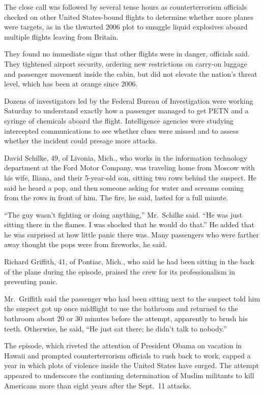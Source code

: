 ﻿\documentclass[12pt]{article}
\begin{document}
The close call was followed by several tense hours as counterterrorism officials checked on other
United States-bound flights to determine whether more planes were targets, as in the thwarted 2006
plot to smuggle liquid explosives aboard multiple flights leaving from Britain.

They found no immediate signs that other flights were in danger, officials said. They tightened
airport security, ordering new restrictions on carry-on luggage and passenger movement inside the
cabin, but did not elevate the nation's threat level, which has been at orange since 2006.

Dozens of investigators led by the Federal Bureau of Investigation were working Saturday to
understand exactly how a passenger managed to get PETN and a syringe of chemicals aboard the flight.
Intelligence agencies were studying intercepted communications to see whether clues were missed and
to assess whether the incident could presage more attacks.

David Schilke, 49, of Livonia, Mich., who works in the information technology department at the Ford
Motor Company, was traveling home from Moscow with his wife, Iliana, and their 5-year-old son,
sitting two rows behind the suspect. He said he heard a pop, and then someone asking for water and
screams coming from the rows in front of him. The fire, he said, lasted for a full minute.

``The guy wasn't fighting or doing anything,'' Mr.~Schilke said. ``He was just sitting there in the
flames. I was shocked that he would do that.'' He added that he was surprised at how little panic
there was. Many passengers who were farther away thought the pops were from fireworks, he said.

Richard Griffith, 41, of Pontiac, Mich., who said he had been sitting in the back of the plane
during the episode, praised the crew for its professionalism in preventing panic.

Mr.~Griffith said the passenger who had been sitting next to the suspect told him the suspect got up
once midflight to use the bathroom and returned to the bathroom about 20 or 30 minutes before the
attempt, apparently to brush his teeth. Otherwise, he said, ``He just sat there; he didn't talk to
nobody.''

The episode, which riveted the attention of President Obama on vacation in Hawaii and prompted
counterterrorism officials to rush back to work, capped a year in which plots of violence inside the
United States have surged. The attempt appeared to underscore the continuing determination of Muslim
militants to kill Americans more than eight years after the Sept.~11 attacks.
\end{document}
